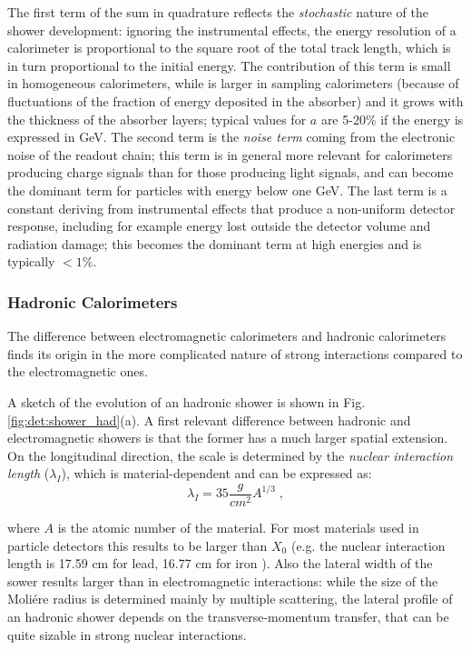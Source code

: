 The first term of the sum in quadrature reflects the \textit{stochastic} nature of the shower development: ignoring the instrumental effects, the energy resolution of a calorimeter is proportional to the square root of the total track length, which is in turn proportional to the initial energy. The contribution of this term is small in homogeneous calorimeters, while is larger in sampling calorimeters (because of fluctuations of the fraction of energy deposited in the absorber) and it grows with the thickness of the absorber layers; typical values for $a$ are 5-20\% if the energy is expressed in GeV. The second term is the \textit{noise term} coming from the electronic noise of the readout chain; this term is in general more relevant for calorimeters producing charge signals than for those producing light signals, and can become the dominant term for particles with energy below one GeV. The last term is a constant deriving from instrumental effects that produce a non-uniform detector response, including for example energy lost outside the detector volume and radiation damage; this becomes the dominant term at high energies and is typically $<1\%$. 



\subsubsection{Hadronic Calorimeters}

The difference between electromagnetic calorimeters and hadronic calorimeters finds its origin in the more complicated nature of strong interactions compared to the electromagnetic ones. 

A sketch of the evolution of an hadronic shower is shown in Fig. \ref{fig:det:shower_had}(a). A first relevant difference between hadronic and electromagnetic showers is that the former has a much larger spatial extension. On the longitudinal direction, the scale is determined by the \textit{nuclear interaction length} ($\lambda_I$), which is material-dependent and can be expressed as:
\begin{equation}
\lambda_I = 35 \frac{g}{cm^2} A^{1/3} \; ,
\end{equation}

where $A$ is the atomic number of the material. For most materials used in particle detectors this results to be larger than $X_0$ (e.g. the nuclear interaction length is 17.59 cm for lead, 16.77 cm for iron \cite{Patrignani:2016xqp}). Also the lateral width of the sower results larger than in electromagnetic interactions: while the size of the Moli\'ere radius is determined mainly by multiple scattering, the lateral profile of an hadronic shower depends on the transverse-momentum transfer, that can be quite sizable in strong nuclear interactions. 



